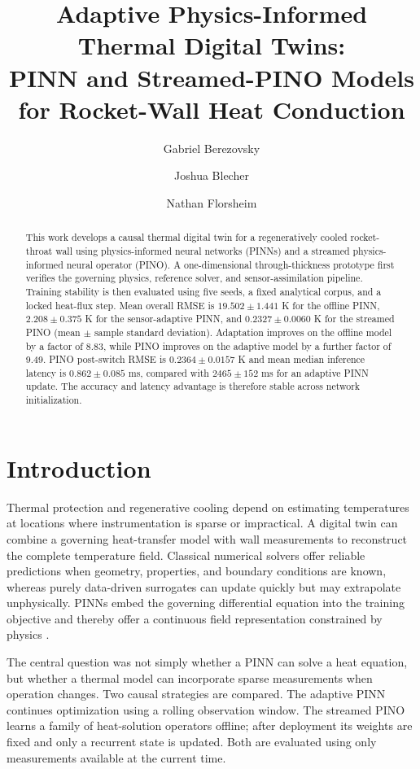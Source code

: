 \documentclass[journal]{new-aiaa}
\title{Adaptive Physics-Informed Thermal Digital Twins:\\PINN and Streamed-PINO Models for Rocket-Wall Heat Conduction}
\author{Gabriel Berezovsky}
\affil{gabrielb@campus.technion.ac.il, 941220121}
\author{Joshua Blecher}
\affil{bjoshua@campus.technion.ac.il, 941220097}
\author{Nathan Florsheim}
\affil{nathanf@campus.technion.ac.il, 800001653}
\begin{document}
\maketitle

\begin{abstract}
This work develops a causal thermal digital twin for a regeneratively cooled rocket-throat wall using physics-informed neural networks (PINNs) and a streamed physics-informed neural operator (PINO). A one-dimensional through-thickness prototype first verifies the governing physics, reference solver, and sensor-assimilation pipeline. Training stability is then evaluated using five seeds, a fixed analytical corpus, and a locked heat-flux step. Mean overall RMSE is $19.502\pm1.441$ K for the offline PINN, $2.208\pm0.375$ K for the sensor-adaptive PINN, and $0.2327\pm0.0060$ K for the streamed PINO (mean $\pm$ sample standard deviation). Adaptation improves on the offline model by a factor of 8.83, while PINO improves on the adaptive model by a further factor of 9.49. PINO post-switch RMSE is $0.2364\pm0.0157$ K and mean median inference latency is $0.862\pm0.085$ ms, compared with $2465\pm152$ ms for an adaptive PINN update. The accuracy and latency advantage is therefore stable across network initialization.
\end{abstract}

\section{Introduction}
Thermal protection and regenerative cooling depend on estimating temperatures at locations where instrumentation is sparse or impractical. A digital twin can combine a governing heat-transfer model with wall measurements to reconstruct the complete temperature field. Classical numerical solvers offer reliable predictions when geometry, properties, and boundary conditions are known, whereas purely data-driven surrogates can update quickly but may extrapolate unphysically. PINNs embed the governing differential equation into the training objective and thereby offer a continuous field representation constrained by physics \cite{raissi2019,cai2021}.

The central question was not simply whether a PINN can solve a heat equation, but whether a thermal model can incorporate sparse measurements when operation changes. Two causal strategies are compared. The adaptive PINN continues optimization using a rolling observation window. The streamed PINO learns a family of heat-solution operators offline; after deployment its weights are fixed and only a recurrent state is updated. Both are evaluated using only measurements available at the current time.
\end{document}

